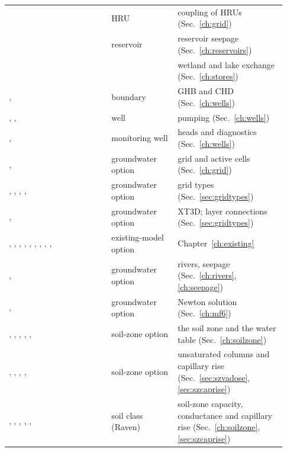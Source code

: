 \begin{longtable}{P{0.348\linewidth}P{0.22\linewidth}P{0.36\linewidth}}
 & HRU & coupling of HRUs (Sec.~\ref{ch:grid})\\
 & reservoir & reservoir seepage (Sec.~\ref{ch:reservoirs})\\
 &  & wetland and lake exchange (Sec.~\ref{ch:stores})\\
,  & boundary & GHB and CHD (Sec.~\ref{ch:wells})\\
, ,  & well & pumping (Sec.~\ref{ch:wells})\\
,  & monitoring well & heads and diagnostics (Sec.~\ref{ch:wells})\\
,  & groundwater option & grid and active cells (Sec.~\ref{ch:grid})\\
, , , ,  & groundwater option & grid types (Sec.~\ref{sec:gridtypes})\\
,  & groundwater option & XT3D; layer connections (Sec.~\ref{sec:gridtypes})\\
, , , , , , , , ,  & existing-model option & Chapter~\ref{ch:existing}\\
,  & groundwater option & rivers, seepage (Sec.~\ref{ch:rivers}, \ref{ch:seepage})\\
,  & groundwater option & Newton solution (Sec.~\ref{ch:mf6})\\
, , , , ,  & soil-zone option & the soil zone and the water table (Sec.~\ref{ch:soilzone})\\
, , , ,  & soil-zone option & unsaturated columns and capillary rise (Sec.~\ref{sec:szvadose}, \ref{sec:szcaprise})\\
, , , , ,  & soil class (Raven) & soil-zone capacity, conductance and capillary rise (Sec.~\ref{ch:soilzone}, \ref{sec:szcaprise})\\\bottomrule
\end{longtable}

